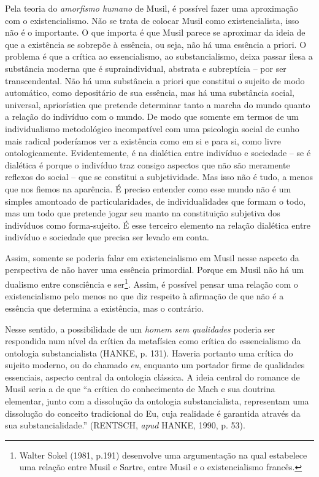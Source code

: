 Pela teoria do \emph{amorfismo humano} de Musil, é possível fazer uma
aproximação com o existencialismo. Não se trata de colocar Musil como
existencialista, isso não é o importante. O que importa é que Musil
parece se aproximar da ideia de que a existência se sobrepõe à essência,
ou seja, não há uma essência a priori. O problema é que a crítica ao
essencialismo, ao substancialismo, deixa passar ilesa a substância
moderna que é supraindividual, abstrata e subreptícia -- por ser
transcendental. Não há uma substância a priori que constitui o sujeito
de modo automático, como depositário de sua essência, mas há uma
substância social, universal, apriorística que pretende determinar tanto
a marcha do mundo quanto a relação do indivíduo com o mundo. De modo que
somente em termos de um individualismo metodológico incompatível com uma
psicologia social de cunho mais radical poderíamos ver a existência como
em si e para si, como livre ontologicamente. Evidentemente, é na
dialética entre indivíduo e sociedade -- se é dialética é porque o
indivíduo traz consigo aspectos que não são meramente reflexos do social
-- que se constitui a subjetividade. Mas isso não é tudo, a menos que
nos fiemos na aparência. É preciso entender como esse mundo não é um
simples amontoado de particularidades, de individualidades que formam o
todo, mas um todo que pretende jogar seu manto na constituição subjetiva
dos indivíduos como forma-sujeito. É esse terceiro elemento na relação
dialética entre indivíduo e sociedade que precisa ser levado em conta.

Assim, somente se poderia falar em existencialismo em Musil nesse
aspecto da perspectiva de não haver uma essência primordial. Porque em
Musil não há um dualismo entre consciência e ser\footnote{Walter Sokel
  (1981, p.191) desenvolve uma argumentação na qual estabelece uma
  relação entre Musil e Sartre, entre Musil e o existencialismo francês.}.
Assim, é possível pensar uma relação com o existencialismo pelo menos no
que diz respeito à afirmação de que não é a essência que determina a
existência, mas o contrário.

Nesse sentido, a possibilidade de um \emph{homem sem qualidades} poderia
ser respondida num nível da crítica da metafísica como crítica do
essencialismo da ontologia substancialista (HANKE, p. 131). Haveria
portanto uma crítica do sujeito moderno, ou do chamado \emph{eu},
enquanto um portador firme de qualidades essenciais, aspecto central da
ontologia clássica. A ideia central do romance de Musil seria a de que
``a crítica do conhecimento de Mach e sua doutrina elementar, junto com
a dissolução da ontologia substancialista, representam uma dissolução do
conceito tradicional do Eu, cuja realidade é garantida através da sua
substancialidade.'' (RENTSCH, \emph{apud} HANKE, 1990, p. 53).

